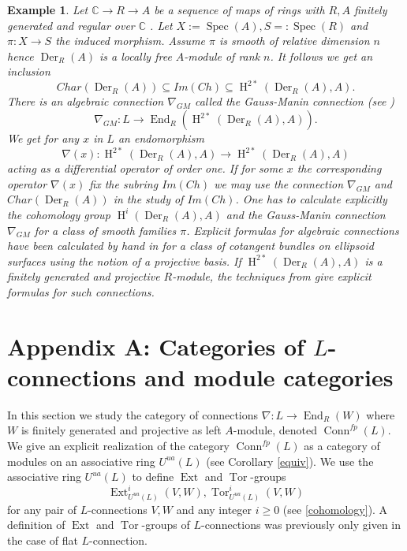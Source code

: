 \documentclass{amsart}
\theoremstyle{plain}
\newtheorem{example}[theorem]{Example}
\theoremstyle{definition}
\theoremstyle{remark}
\numberwithin{equation}{theorem}
\begin{document}
\begin{example} 

Let ${\mathbb{C} }\rightarrow {R} \rightarrow {A}$ be a sequence of maps of rings with ${R},{A}$ finitely generated and regular over ${\mathbb{C} }$ .
Let $X:={\operatorname{Spec} }({A}), S=:{\operatorname{Spec} }({R})$ and $\pi:X\rightarrow S$ the induced morphism. Assume $\pi$ is smooth of relative dimension
$n$ hence ${\operatorname{Der} }_{R}({A})$ is a locally free ${A}$-module of rank $n$. It follows we get an inclusion
\[ Char({\operatorname{Der} }_{R}({A}))\subseteq Im(Ch) \subseteq {\operatorname{H} }^{2*}({\operatorname{Der} }_{R}({A}), {A}) .\]
There is an algebraic connection $\nabla_{GM}$ called the Gauss-Manin connection (see \cite{maa15})
\[ \nabla_{GM}: L \rightarrow {\operatorname{End} }_{R}({\operatorname{H} }^{2*}({\operatorname{Der} }_{R}({A}),{A})) .\]
We get for any $x$ in $L$ an endomorphism
\[ \nabla(x): {\operatorname{H} }^{2*}({\operatorname{Der} }_{R}({A}),{A})\rightarrow {\operatorname{H} }^{2*}({\operatorname{Der} }_{R}({A}),{A})  \]
acting as a differential operator of order one.
If for some $x$ the corresponding operator
 $\nabla(x)$ fix the subring $Im(Ch)$ we may use the connection 
$\nabla_{GM}$ and $Char({\operatorname{Der} }_{R}({A}))$ in the study
of $Im(Ch)$. One has to calculate explicitly the cohomology group ${\operatorname{H} }^i({\operatorname{Der} }_{R}({A}),{A})$ and the Gauss-Manin connection
$\nabla_{GM}$ for a class of smooth families $\pi$. Explicit formulas for algebraic connections 
have been calculated by hand in \cite{maa0} for a class of cotangent bundles on ellipsoid surfaces using the notion
of a projective basis. If ${\operatorname{H} }^{2*}({\operatorname{Der} }_{R}({A}),{A})$ is a finitely generated and projective ${R}$-module, the techniques
from \cite{maa0} give explicit formulas for such connections.
\end{example}

\section{Appendix A: Categories of $L$-connections and module categories}

In this section we study the category of connections $\nabla:L\rightarrow {\operatorname{End} }_{R}(W)$ where  $W$ is
finitely generated and projective as left ${A}$-module, denoted ${\operatorname{Conn}}^{fp}(L)$. We give an explicit realization of
 the category ${\operatorname{Conn}}^{fp}(L)$ as a category of modules on an associative ring ${U^{ua}}(L)$ (see Corollary \ref{equiv}).
We use the associative ring ${U^{ua}}(L)$ to define ${\operatorname{Ext} }$ and ${\operatorname{Tor} }$-groups
\[ {\operatorname{Ext} }^i_{{U^{ua}}(L)}(V,W) , {\operatorname{Tor} }^i_{{U^{ua}}(L)}(V,W) \]
for any pair of $L$-connections $V,W$ and any integer $i\geq 0$ (see \ref{cohomology}).
A definition of ${\operatorname{Ext} }$ and ${\operatorname{Tor} }$-groups of $L$-connections was previously only given in the case of flat $L$-connection.
\end{document}
